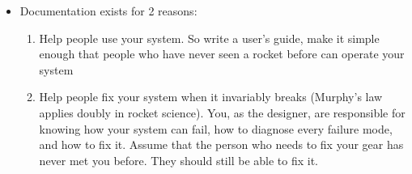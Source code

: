 \begin{itemize}
\item Documentation exists for 2 reasons:
\begin{enumerate}
\item Help people use your system. So write a user's guide, make it simple enough that people who have never seen a rocket before can operate your system
\item Help people fix your system when it invariably breaks (Murphy's law applies doubly in rocket science). You, as the designer, are responsible for knowing how your system can fail, how to diagnose every failure mode, and how to fix it. Assume that the person who needs to fix your gear has never met you before. They should still be able to fix it.
\end{enumerate}
\end{itemize}
